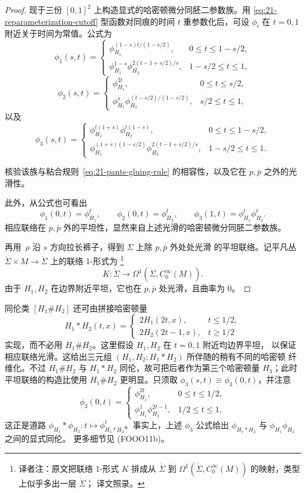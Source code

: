 \begin{proof}
现于三份 $[0,1]^2$ 上构造显式的哈密顿微分同胚二参数族。用
\eqref{eq:21-reparameterization-cutoff} 型函数对同痕的时间 $t$ 重参数化后，可设
$\phi_i$ 在 $t=0,1$ 附近关于时间为常值。公式为
\[
 \phi_1(s,t)=
 \begin{cases}
 \phi_{H_1}^{(1-s)t/(1-s/2)},&0\leq t\leq1-s/2,\\
 \phi_{H_1}^{1-s}\phi_{H_2}^{2(t-1+s/2)/s},&1-s/2\leq t\leq1,
 \end{cases}
\]
\[
 \phi_2(s,t)=
 \begin{cases}
 \phi_{H_1}^{2t},&0\leq t\leq s/2,\\
 \phi_{H_1}^{s}\phi_{H_2}^{(t-s/2)/(1-s/2)},&s/2\leq t\leq1,
 \end{cases}
\]
以及
\[
 \phi_3(s,t)=
 \begin{cases}
 \phi_{H_1}^{t(1+s)}\phi_{H_2}^{t(1-s)},&0\leq t\leq1-s/2,\\
 \phi_{H_1}^{(1+s)(1-s/2)}
 \phi_{H_2}^{2(t-1+s/2)/s},&1-s/2\leq t\leq1.
 \end{cases}
\]

\begin{exercise}
\label{ex:21-pants-family-compatibility}
核验该族与粘合规则~\eqref{eq:21-pants-gluing-rule} 的相容性，以及它在
$p,\bar p$ 之外的光滑性。
\end{exercise}

此外，从公式也可看出
\[
 \phi_1(0,t)=\phi_{H_1}^t,\qquad
 \phi_2(0,t)=\phi_{H_2}^t,\qquad
 \phi_3(1,t)=\phi_{H_1}^t\phi_{H_2}^t.
\]
相应联络在 $p,\bar p$ 外的平坦性，显然来自上述光滑的哈密顿微分同胚二参数族。

再用\termElongationFunction{}~$\rho$ 沿 $s$ 方向拉长裤子，得到 $\Sigma$ 上除 $p,\bar p$ 外处处光滑
的平坦联络。记平凡丛 $\dot\Sigma\times M\to\dot\Sigma$ 上的联络 1-形式为
\footnote{译者注：原文把联络 1-形式 $K$ 排成从 $\dot\Sigma$ 到
$\Omega^1(\dot\Sigma,C_0^\infty(M))$ 的映射，类型上似乎多出一层 $\dot\Sigma$；
译文照录。}
\[
 K:\dot\Sigma\longrightarrow\Omega^1(\dot\Sigma,C_0^\infty(M)).
\]
由于 $H_1,H_2$ 在边界附近平坦，它也在 $p,\bar p$ 处光滑，且曲率为 $0$。
\end{proof}

\begin{remark}
\label{rem:21-concatenation-hamiltonian}
同伦类 $[H_1\#H_2]$ 还可由拼接哈密顿量
\[
 H_1*H_2(t,x)=
 \begin{cases}
 2H_1(2t,x),&t\leq1/2,\\
 2H_2(2t-1,x),&t\geq1/2
 \end{cases}
\]
实现，而不必用 $H_1\#H_2$。这里假设 $H_1,H_2$ 在 $t=0,1$ 附近均边界平坦，
以保证相应联络光滑。这给出三元组 $(H_1,H_2;H_1*H_2)$ 所伴随的稍有不同的哈密顿
纤维化。不过 $H_1\#H_2$ 与 $H_1*H_2$ 同伦，故可把后者作为第三个哈密顿量
$H_3$；此时平坦联络的构造比使用 $H_1\#H_2$ 更明显。只须取
$\phi_3(s,t)\equiv\phi_3(0,t)$，并注意
\[
 \phi_3(0,t)=
 \begin{cases}
 \phi_{H_1}^{2t},&0\leq t\leq1/2,\\
 \phi_{H_1}^1\phi_{H_2}^{2t-1},&1/2\leq t\leq1,
 \end{cases}
\]
这正是道路 $\phi_{H_1}*\phi_{H_2}:t\mapsto\phi_{H_1*H_2}^t$。事实上，上述
$\phi_3$ 公式给出 $\phi_{H_1*H_2}$ 与 $\phi_{H_1}\phi_{H_2}$ 之间的显式同伦。
更多细节见 (FOOO11b)。
\end{remark}

